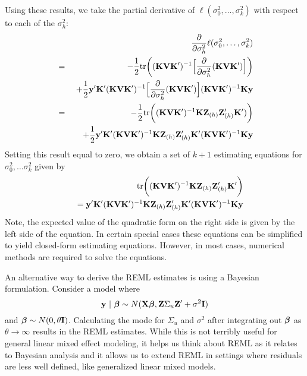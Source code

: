 Using these results, we take the partial derivative of $\ell(\sigma^2_0, \ldots , \sigma^2_k)$ with respect to each of the $\sigma^2_{h}$:
\begin{eqnarray*}
&&\frac{\partial}{\partial \sigma^2_h} \ell(\sigma^2_0, \ldots , \sigma^2_k)\\
&=& -\frac{1}{2} \mathrm{tr} \bigg((\mathbf{K} \mathbf{V} \mathbf{K}')^{-1} \Big[ \frac{\partial}{\partial \sigma^2_{h}} (\mathbf{K} \mathbf{V} \mathbf{K}') \Big] \bigg) \\
& &  \,\, +\frac{1}{2} \mathbf{y}' \mathbf{K}'(\mathbf{K} \mathbf{V} \mathbf{K}')^{-1}  \Big[\frac{\partial}{\partial \sigma^2_{h}} (\mathbf{K} \mathbf{V} \mathbf{K}')\Big] (\mathbf{K} \mathbf{V} \mathbf{K}')^{-1} \mathbf{K} \mathbf{y}\\
&=& -\frac{1}{2} \mathrm{tr} \bigg((\mathbf{K} \mathbf{V} \mathbf{K}')^{-1} \mathbf{K} \mathbf{Z}_{(h)} \mathbf{Z}_{(h)}' \mathbf{K}' )\bigg) \\
& &  \,\, +\frac{1}{2} \mathbf{y}' \mathbf{K}'(\mathbf{K} \mathbf{V} \mathbf{K}')^{-1}  \mathbf{K} \mathbf{Z}_{(h)} \mathbf{Z}_{(h)}' \mathbf{K}' (\mathbf{K} \mathbf{V} \mathbf{K}')^{-1} \mathbf{K} \mathbf{y}
\end{eqnarray*}
Setting this result equal to zero, we obtain a set of $k+1$ estimating equations for $\sigma^2_0, \ldots \sigma^2_k$ given by
\begin{eqnarray*}
& &  \mathrm{tr} \bigg((\mathbf{K} \mathbf{V} \mathbf{K}')^{-1} \mathbf{K} \mathbf{Z}_{(h)} \mathbf{Z}_{(h)}' \mathbf{K}' \bigg) \\
& &  \,\, =  \mathbf{y}' \mathbf{K}'(\mathbf{K} \mathbf{V} \mathbf{K}')^{-1}  \mathbf{K} \mathbf{Z}_{(h)} \mathbf{Z}_{(h)}' \mathbf{K}' (\mathbf{K} \mathbf{V} \mathbf{K}')^{-1} \mathbf{K} \mathbf{y}
\end{eqnarray*}
Note, the expected value of the quadratic form on the right side is given by the left side of the equation.
In certain special cases these equations can be simplified to yield closed-form estimating equations. 
However, in most cases, numerical methods are required to solve the equations.

An alternative way to derive the REML estimates is using a Bayesian formulation. 
Consider a  model where $$\mathbf{y} ~|~\mbox{\boldmath $\beta$} \sim N(\mathbf{X} \mbox{\boldmath $\beta$}, \mathbf{Z} \Sigma_u \mathbf{Z}' +\sigma^2 \mathbf{I})$$ 
and $\mbox{\boldmath $\beta$} \sim N(0, \theta \mathbf{I})$. 
Calculating the mode for $\Sigma_u$ and $\sigma^2$
after integrating out $\mbox{\boldmath $\beta$}$ as $\theta \rightarrow \infty$ results in the REML estimates.
While this is not terribly useful for general linear mixed effect modeling, it helps us think about REML as it relates to Bayesian analysis and it allows us to extend REML in settings
where residuals are less well defined, like generalized linear mixed models.


